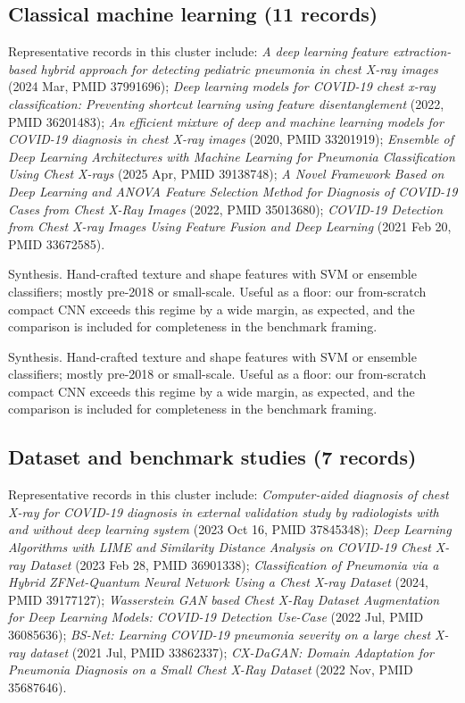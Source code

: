 \subsection*{Classical machine learning (11 records)}
Representative records in this cluster include: \emph{A deep learning feature extraction-based hybrid approach for detecting pediatric pneumonia in chest X-ray images} (2024 Mar, PMID 37991696); \emph{Deep learning models for COVID-19 chest x-ray classification: Preventing shortcut learning using feature disentanglement} (2022, PMID 36201483); \emph{An efficient mixture of deep and machine learning models for COVID-19 diagnosis in chest X-ray images} (2020, PMID 33201919); \emph{Ensemble of Deep Learning Architectures with Machine Learning for Pneumonia Classification Using Chest X-rays} (2025 Apr, PMID 39138748); \emph{A Novel Framework Based on Deep Learning and ANOVA Feature Selection Method for Diagnosis of COVID-19 Cases from Chest X-Ray Images} (2022, PMID 35013680); \emph{COVID-19 Detection from Chest X-ray Images Using Feature Fusion and Deep Learning} (2021 Feb 20, PMID 33672585).\par

Synthesis. Hand-crafted texture and shape features with SVM or ensemble classifiers; mostly pre-2018 or small-scale. Useful as a floor: our from-scratch compact CNN exceeds this regime by a wide margin, as expected, and the comparison is included for completeness in the benchmark framing.


Synthesis. Hand-crafted texture and shape features with SVM or ensemble classifiers; mostly pre-2018 or small-scale. Useful as a floor: our from-scratch compact CNN exceeds this regime by a wide margin, as expected, and the comparison is included for completeness in the benchmark framing.


\subsection*{Dataset and benchmark studies (7 records)}
Representative records in this cluster include: \emph{Computer-aided diagnosis of chest X-ray for COVID-19 diagnosis in external validation study by radiologists with and without deep learning system} (2023 Oct 16, PMID 37845348); \emph{Deep Learning Algorithms with LIME and Similarity Distance Analysis on COVID-19 Chest X-ray Dataset} (2023 Feb 28, PMID 36901338); \emph{Classification of Pneumonia via a Hybrid ZFNet-Quantum Neural Network Using a Chest X-ray Dataset} (2024, PMID 39177127); \emph{Wasserstein GAN based Chest X-Ray Dataset Augmentation for Deep Learning Models: COVID-19 Detection Use-Case} (2022 Jul, PMID 36085636); \emph{BS-Net: Learning COVID-19 pneumonia severity on a large chest X-ray dataset} (2021 Jul, PMID 33862337); \emph{CX-DaGAN: Domain Adaptation for Pneumonia Diagnosis on a Small Chest X-Ray Dataset} (2022 Nov, PMID 35687646).\par

